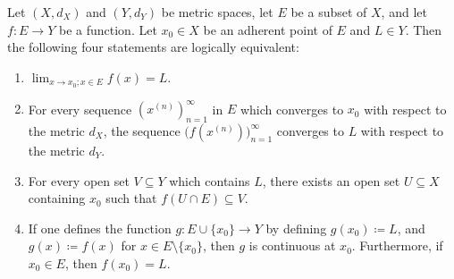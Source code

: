 \begin{proposition}\label{3.1.5}
    Let \((X, d_X)\) and \((Y, d_Y)\) be metric spaces, let \(E\) be a subset of \(X\), and let \(f : E \to Y\) be a function.
    Let \(x_0 \in X\) be an adherent point of \(E\) and \(L \in Y\).
    Then the following four statements are logically equivalent:
    \begin{enumerate}
        \item \(\lim_{x \to x_0 ; x \in E} f(x) = L\).
        \item For every sequence \((x^{(n)})_{n = 1}^\infty\) in \(E\) which converges to \(x_0\) with respect to the metric \(d_X\), the sequence \(\big(f(x^{(n)})\big)_{n = 1}^\infty\) converges to \(L\) with respect to the metric \(d_Y\).
        \item For every open set \(V \subseteq Y\) which contains \(L\), there exists an open set \(U \subseteq X\) containing \(x_0\) such that \(f(U \cap E) \subseteq V\).
        \item If one defines the function \(g : E \cup \{x_0\} \to Y\) by defining \(g(x_0) \coloneqq L\), and \(g(x) \coloneqq f(x)\) for \(x \in E \setminus \{x_0\}\), then \(g\) is continuous at \(x_0\).
              Furthermore, if \(x_0 \in E\), then \(f(x_0) = L\).
    \end{enumerate}
\end{proposition}

